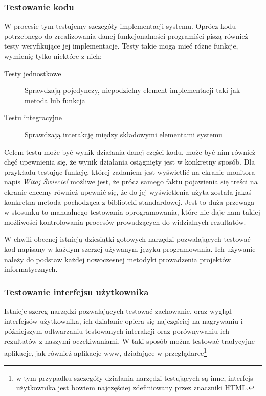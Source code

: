 	    \subsubsection{Testowanie kodu}
	    
	      W procesie tym testujemy szczegóły implementacji systemu. Oprócz kodu potrzebnego do zrealizowania danej funkcjonalności programiści piszą również testy weryfikujące jej implementację. Testy takie mogą mieć różne funkcje, wymienię tylko niektóre z nich:
	      
	      \begin{description}
	        \item[Testy jednostkowe] Sprawdzają pojedynczy, niepodzielny element implementacji taki jak metoda lub funkcja
	        \item[Testu integracyjne] Sprawdzają interakcję między składowymi elementami systemu
        \end{description}
        
        Celem testu może być wynik działania danej części kodu, może być nim również chęć upewnienia się, że wynik działania osiągnięty jest w konkretny sposób. Dla przykładu testując funkcję, której zadaniem jest wyświetlić na ekranie monitora napis \emph{Witaj Świecie!} możliwe jest, że prócz samego faktu pojawienia się treści na ekranie chcemy również upewnić się, że do jej wyświetlenia użyta została jakaś konkretna metoda pochodząca z biblioteki standardowej. Jest to duża przewaga w stosunku to manualnego testowania oprogramowania, które nie daje nam takiej możliwości kontrolowania procesów prowadzących do widzialnych rezultatów.

        W chwili obecnej istnieją dziesiątki gotowych narzędzi pozwalających testować kod napisany w każdym szerzej używanym języku programowania. Ich używanie należy do podstaw każdej nowoczesnej metodyki prowadzenia projektów informatycznych.
        
      \subsubsection{Testowanie interfejsu użytkownika}
        
        Istnieje szereg narzędzi pozwalających testować zachowanie, oraz wygląd interfejsów użytkownika, ich działanie opiera się najczęściej na nagrywaniu i późniejszym odtwarzaniu testowanych interakcji oraz porównywaniu ich rezultatów z naszymi oczekiwaniami. W taki sposób można testować tradycyjne aplikacje, jak również aplikacje www, działające w przeglądarce\footnote{w tym  przypadku szczegóły działania narzędzi testujących są inne, interfejs użytkownika jest bowiem najczęściej zdefiniowany przez znaczniki HTML.}
        
